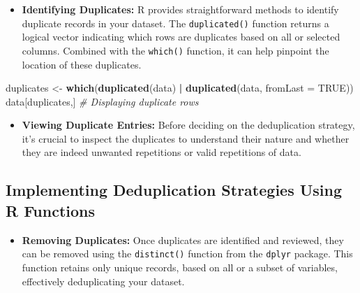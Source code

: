 \documentclass[
]{book}
\newenvironment{Shaded}{\begin{snugshade}}{\end{snugshade}}
\newcommand{\AttributeTok}[1]{\textcolor[rgb]{0.13,0.29,0.53}{#1}}
\newcommand{\CommentTok}[1]{\textcolor[rgb]{0.56,0.35,0.01}{\textit{#1}}}
\newcommand{\ConstantTok}[1]{\textcolor[rgb]{0.56,0.35,0.01}{#1}}
\newcommand{\FunctionTok}[1]{\textcolor[rgb]{0.13,0.29,0.53}{\textbf{#1}}}
\newcommand{\NormalTok}[1]{#1}
\newcommand{\OtherTok}[1]{\textcolor[rgb]{0.56,0.35,0.01}{#1}}
\newcommand{\SpecialCharTok}[1]{\textcolor[rgb]{0.81,0.36,0.00}{\textbf{#1}}}
\providecommand{\tightlist}{%
  \setlength{\itemsep}{0pt}\setlength{\parskip}{0pt}}
\begin{document}
\begin{itemize}
\tightlist
\item
  \textbf{Identifying Duplicates:} R provides straightforward methods to identify duplicate records in your dataset. The \texttt{duplicated()} function returns a logical vector indicating which rows are duplicates based on all or selected columns. Combined with the \texttt{which()} function, it can help pinpoint the location of these duplicates.
\end{itemize}

\begin{Shaded}
\begin{Highlighting}[]
\NormalTok{duplicates }\OtherTok{\textless{}{-}} \FunctionTok{which}\NormalTok{(}\FunctionTok{duplicated}\NormalTok{(data) }\SpecialCharTok{|} \FunctionTok{duplicated}\NormalTok{(data, }\AttributeTok{fromLast =} \ConstantTok{TRUE}\NormalTok{))}
\NormalTok{data[duplicates,] }\CommentTok{\# Displaying duplicate rows}
\end{Highlighting}
\end{Shaded}

\begin{itemize}
\tightlist
\item
  \textbf{Viewing Duplicate Entries:} Before deciding on the deduplication strategy, it's crucial to inspect the duplicates to understand their nature and whether they are indeed unwanted repetitions or valid repetitions of data.
\end{itemize}

\hypertarget{implementing-deduplication-strategies-using-r-functions}{%
\subsection*{Implementing Deduplication Strategies Using R Functions}\label{implementing-deduplication-strategies-using-r-functions}}

\begin{itemize}
\tightlist
\item
  \textbf{Removing Duplicates:} Once duplicates are identified and reviewed, they can be removed using the \texttt{distinct()} function from the \texttt{dplyr} package. This function retains only unique records, based on all or a subset of variables, effectively deduplicating your dataset.
\end{itemize}
\end{document}

